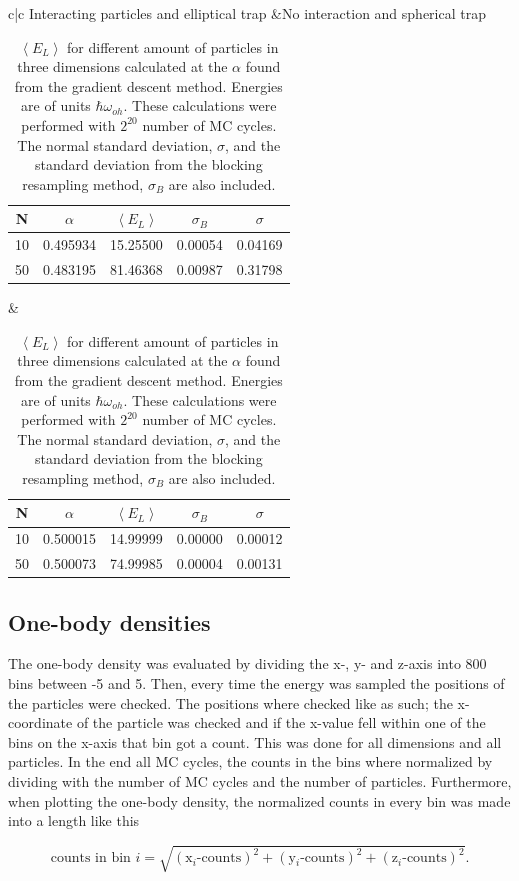 \begin{table}[H]\caption{$\left<E_L\right>$ for different amount of particles in three dimensions calculated at the $\alpha$ found from the gradient descent method. Energies are of units $\hbar\omega_{oh}$. These calculations were performed with $2^{20}$ number of MC cycles. The normal standard deviation, $\sigma$, and the standard deviation from the blocking resampling method, $\sigma_B$ are also included.}\label{tab:interaction_vs_not}
\center
\begin{tabular}{c|c}
Interacting particles and elliptical trap &No interaction and spherical trap\\
\begin{tabular}{ccccc}
N &$\alpha$ & $\left< E_L \right>$ & $\sigma_B$ & $\sigma$\\ \hline
10 &0.495934 & 15.25500 & 0.00054 & 0.04169\\
50 &0.483195 & 81.46368 & 0.00987 & 0.31798\\ 
\end{tabular}&
\begin{tabular}{ccccc}
N &$\alpha$ & $\left< E_L \right>$ & $\sigma_B$ & $\sigma$\\ \hline
10 & 0.500015 & 14.99999 & 0.00000 & 0.00012\\
50 & 0.500073 & 74.99985 & 0.00004 & 0.00131\\
\end{tabular}
\end{tabular}
\end{table} 

\subsection{One-body densities}

The one-body density was evaluated by dividing the x-, y- and z-axis into 800 bins between -5 and 5. Then, every time the energy was sampled the positions of the particles were checked. The positions where checked like as such; the x-coordinate of the particle was checked and if the x-value fell within one of the bins on the x-axis that bin got a count. This was done for all dimensions and all particles. In the end all MC cycles, the counts in the bins where normalized by dividing with the number of MC cycles and the number of particles. Furthermore, when plotting the one-body density, the normalized counts in every bin was made into a length like this

$$\text{counts in bin $i$} =  \sqrt{ (\text{x$_i$-counts})^2 + (\text{y$_i$-counts})^2 + (\text{z$_i$-counts})^2}.$$

